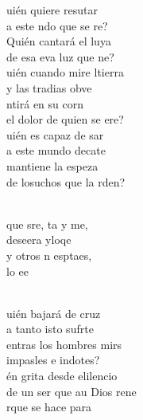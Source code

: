 \documentclass[12pt]{article}
\begin{document}
\begin{multicols*}{2}
\begin{cancion}%
	uién quiere resutar \\
	a este ndo que se re?\\
	Quién cantará el luya\\
	de esa eva luz que ne?\\
\jump
	uién cuando mire ltierra \\
	y las tradias obve\\
	ntirá en su corn  \\
	el dolor de quien se ere?\\
\jump
	uién es capaz de sar \\
	a este mundo decate\\
	mantiene la espeza \\
	de losuchos que la rden?\\\jump\\
	\begin{chorus}%
	que sre, ta y me, \\
	deseera yloqe\\
	y otros n esptaes, \\
	lo ee\\
	\end{chorus}%
	\jump\\
	uién bajará de  cruz \\
	a tanto isto sufrte\\
	entras los hombres mirs \\
	impasles e indotes?\\
\jump
	én grita desde elilencio \\
	de un ser que au Dios rene\\
	rque se hace para \\

\end{cancion}
\end{multicols*}
\end{document}
